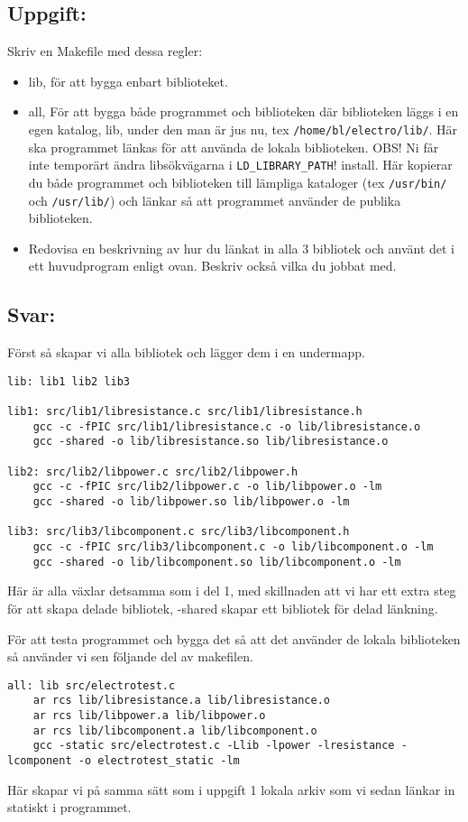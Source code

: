 \documentclass[10pt, a4paper]{article}
\begin{document}
\subsection*{Uppgift:}
Skriv en Makefile med dessa regler:
\begin{itemize}
\item lib, för att bygga enbart biblioteket.
\item all, För att bygga både programmet och biblioteken där biblioteken läggs i en egen katalog, lib,  under den man är jus nu, tex \verb#/home/bl/electro/lib/#. Här ska programmet länkas för att använda de lokala biblioteken. OBS! Ni får inte temporärt ändra libsökvägarna i \verb#LD_LIBRARY_PATH#!
install. Här kopierar du både programmet och biblioteken till lämpliga kataloger (tex \verb#/usr/bin/# och \verb#/usr/lib/#) och länkar så att programmet använder de publika biblioteken.
\item Redovisa en beskrivning av hur du länkat in alla 3 bibliotek och använt det i ett huvudprogram enligt ovan. Beskriv också vilka du jobbat med.
\end{itemize}
\subsection*{Svar:}

 Först så skapar vi alla bibliotek och lägger dem i en undermapp.
\begin{verbatim}
lib: lib1 lib2 lib3

lib1: src/lib1/libresistance.c src/lib1/libresistance.h
    gcc -c -fPIC src/lib1/libresistance.c -o lib/libresistance.o
    gcc -shared -o lib/libresistance.so lib/libresistance.o

lib2: src/lib2/libpower.c src/lib2/libpower.h 
    gcc -c -fPIC src/lib2/libpower.c -o lib/libpower.o -lm
    gcc -shared -o lib/libpower.so lib/libpower.o -lm

lib3: src/lib3/libcomponent.c src/lib3/libcomponent.h 
    gcc -c -fPIC src/lib3/libcomponent.c -o lib/libcomponent.o -lm
    gcc -shared -o lib/libcomponent.so lib/libcomponent.o -lm
\end{verbatim}
Här är alla växlar detsamma som i del 1, med skillnaden att vi har ett extra steg för att skapa delade bibliotek, -shared skapar ett bibliotek för delad länkning.

För att testa programmet och bygga det så att det använder de lokala biblioteken så använder vi sen följande del av makefilen.
\begin{verbatim}
all: lib src/electrotest.c
    ar rcs lib/libresistance.a lib/libresistance.o
    ar rcs lib/libpower.a lib/libpower.o
    ar rcs lib/libcomponent.a lib/libcomponent.o
    gcc -static src/electrotest.c -Llib -lpower -lresistance -lcomponent -o electrotest_static -lm
\end{verbatim}
Här skapar vi på samma sätt som i uppgift 1 lokala arkiv som vi sedan länkar in statiskt i programmet.
\end{document}
